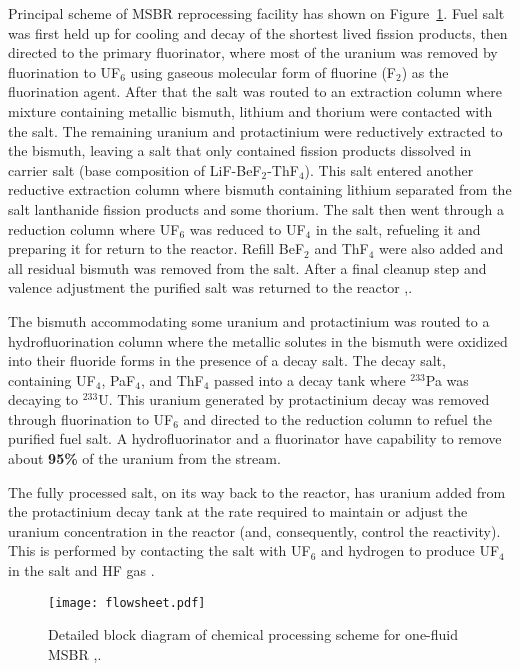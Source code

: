 Principal scheme of \gls{MSBR} reprocessing facility has shown on Figure~\ref{fig:material_flow}. Fuel salt was first held up for cooling and decay of the shortest lived fission products, then directed to the primary fluorinator, where most of the uranium was removed by fluorination to UF$_6$ using gaseous molecular form of fluorine (F$_2$) as the fluorination agent. After that the salt was routed to an extraction column where mixture containing metallic bismuth, lithium and thorium were contacted with the salt. The remaining uranium and protactinium were reductively extracted to the bismuth, leaving a salt that only contained fission products dissolved in carrier salt (base composition of LiF-BeF$_2$-ThF$_4$). This salt entered another reductive extraction column where bismuth containing lithium separated from the salt lanthanide fission products and some thorium. The salt then went through a reduction column where UF$_6$ was reduced to UF$_4$ in the salt, refueling it and preparing it for return to the reactor. Refill BeF$_2$ and ThF$_4$ were also added and all residual bismuth was removed from the salt. After a final cleanup step and valence adjustment the purified salt was returned to the reactor \cite{carter_design_1972},\cite{noauthor_one-fluid_nodate}.

The bismuth accommodating some uranium and protactinium was routed to a hydrofluorination column where the metallic solutes in the bismuth were oxidized into their fluoride forms in the presence of a decay salt. The decay salt, containing UF$_4$, PaF$_4$, and ThF$_4$ passed into a decay tank where $^{233}$Pa was decaying to $^{233}$U. This uranium generated by protactinium decay was removed through fluorination to UF$_6$ and directed to the reduction column to refuel the purified fuel salt. A hydrofluorinator and a fluorinator have capability to remove about \textbf{95\%} of the uranium from the stream.

The fully processed salt, on its way back to the reactor, has uranium added from the protactinium decay tank at the rate required to maintain or adjust the uranium concentration in the reactor (and, consequently, control the reactivity). This is performed by contacting the salt with UF$_6$ and hydrogen to produce UF$_4$ in the salt and HF gas \cite{robertson_conceptual_1971}.

\begin{figure}[htp!] %
  \centering
  \vspace{-0.3em}
  \texttt{[image: flowsheet.pdf]}
  \caption{Detailed block diagram of chemical processing scheme for one-fluid \gls{MSBR} \cite{robertson_conceptual_1971},\cite{noauthor_one-fluid_nodate}.}
  \vspace{-0.6em}
  \label{fig:material_flow}
\end{figure}
\FloatBarrier

